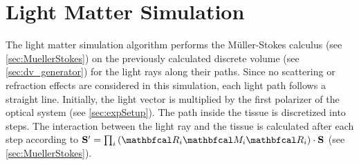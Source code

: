\section{Light Matter Simulation}
\label{sec:simulation}
%
The light matter simulation algorithm performs the M{\"u}ller-Stokes calculus (see \cref{sec:MuellerStokes}) on the previously calculated discrete volume (see \cref{sec:dv_generator}) for the light rays along their paths.
Since no scattering or refraction effects are considered in this simulation, each light path follows a straight line.
Initially, the light vector is multiplied by the first polarizer of the optical system (see \cref{sec:expSetup}).
The path inside the tissue is discretized into steps.
The interaction between the light ray and the tissue is calculated after each step according to $ \vec{S}' = \prod_i \left(\mat{R}_i \mat{M}_i \mat{R}_i\right) \cdot \vec{S}$ (see \cref{sec:MuellerStokes}).
%
%
%
